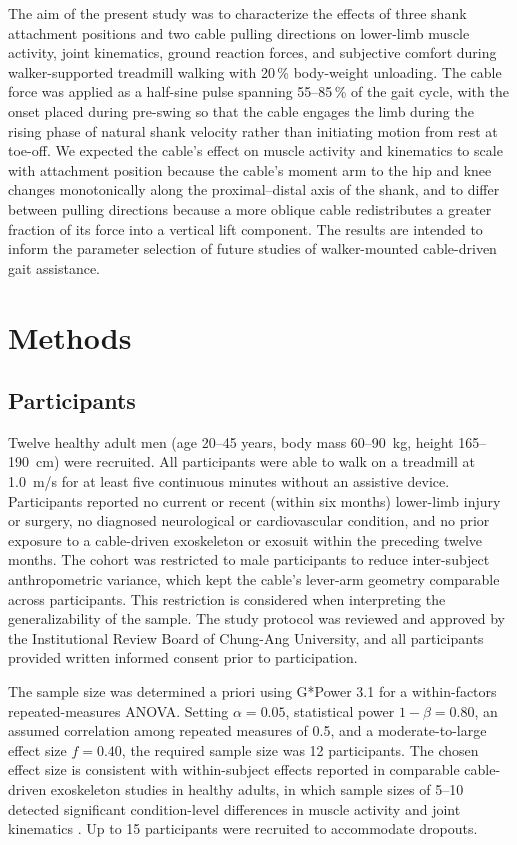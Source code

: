 \documentclass[11pt,a4paper]{article}
\begin{document}
The aim of the present study was to characterize the effects of three shank attachment positions and two cable pulling directions on lower-limb muscle activity, joint kinematics, ground reaction forces, and subjective comfort during walker-supported treadmill walking with 20\,\% body-weight unloading. The cable force was applied as a half-sine pulse spanning 55--85\,\% of the gait cycle, with the onset placed during pre-swing so that the cable engages the limb during the rising phase of natural shank velocity rather than initiating motion from rest at toe-off. We expected the cable's effect on muscle activity and kinematics to scale with attachment position because the cable's moment arm to the hip and knee changes monotonically along the proximal--distal axis of the shank, and to differ between pulling directions because a more oblique cable redistributes a greater fraction of its force into a vertical lift component. The results are intended to inform the parameter selection of future studies of walker-mounted cable-driven gait assistance.

\section{Methods}

\subsection{Participants}
Twelve healthy adult men (age 20--45 years, body mass 60--90~kg, height 165--190~cm) were recruited. All participants were able to walk on a treadmill at 1.0~m/s for at least five continuous minutes without an assistive device. Participants reported no current or recent (within six months) lower-limb injury or surgery, no diagnosed neurological or cardiovascular condition, and no prior exposure to a cable-driven exoskeleton or exosuit within the preceding twelve months. The cohort was restricted to male participants to reduce inter-subject anthropometric variance, which kept the cable's lever-arm geometry comparable across participants. This restriction is considered when interpreting the generalizability of the sample. The study protocol was reviewed and approved by the Institutional Review Board of Chung-Ang University, and all participants provided written informed consent prior to participation.

The sample size was determined a priori using G*Power 3.1 \citep{faul2007} for a within-factors repeated-measures ANOVA. Setting $\alpha=0.05$, statistical power $1-\beta=0.80$, an assumed correlation among repeated measures of 0.5, and a moderate-to-large effect size $f=0.40$, the required sample size was 12 participants. The chosen effect size is consistent with within-subject effects reported in comparable cable-driven exoskeleton studies in healthy adults, in which sample sizes of 5--10 detected significant condition-level differences in muscle activity and joint kinematics \citep{galle2017,quinlivan2017,asbeck2015}. Up to 15 participants were recruited to accommodate dropouts.
\end{document}
